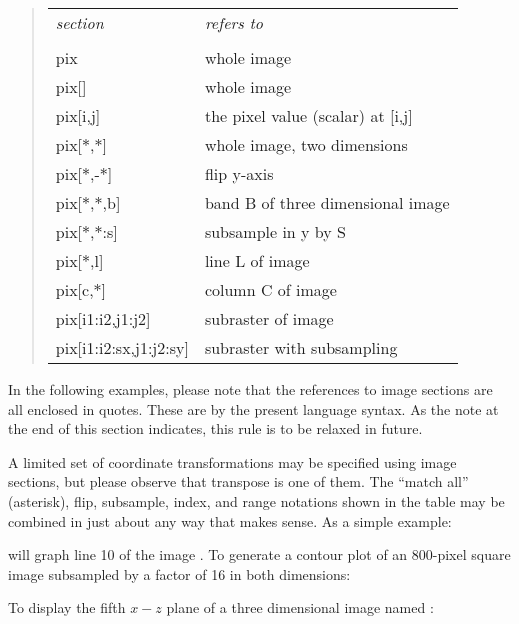\begin{quote}
\begin{tabular}{ll}
{\it section}&   {\it refers to}\\
\\
pix&  whole image\\
pix[]&  whole image\\
pix[i,j]&       the pixel value (scalar) at [i,j]\\
pix[$*$,$*$]&       whole image, two dimensions\\
pix[$*$,-$*$]&      flip y-axis\\
pix[$*$,$*$,b]&     band B of three dimensional image\\
pix[$*$,$*$:s]&     subsample in y by S\\
pix[$*$,l]&       line L of image\\
pix[c,$*$]&       column C of image\\
pix[i1:i2,j1:j2]&       subraster of image\\
pix[i1:i2:sx,j1:j2:sy]& subraster with subsampling
\end{tabular}
\end{quote}

\noindent
In the following examples, please note that the references to image
sections are all enclosed in quotes.  These are 
by the present language syntax.  As the note at the end of this
section indicates, this rule is to be relaxed in future.

A limited set of coordinate transformations may be specified using image
sections, but please observe that transpose is  one of them.
The ``match all'' (asterisk), flip, subsample, index, and range notations
shown in the table may be combined in just about any way that makes sense.
As a simple example:

\begin{quotation}\noindent
{} 
\end{quotation}

\noindent
will graph line 10 of the image .
To generate a contour plot of an 800-pixel square image
subsampled by a factor of 16 in both dimensions:

\begin{quotation}\noindent
{} 
\end{quotation}

\noindent
To display the fifth $x-z$ plane of a three dimensional image named 
:

